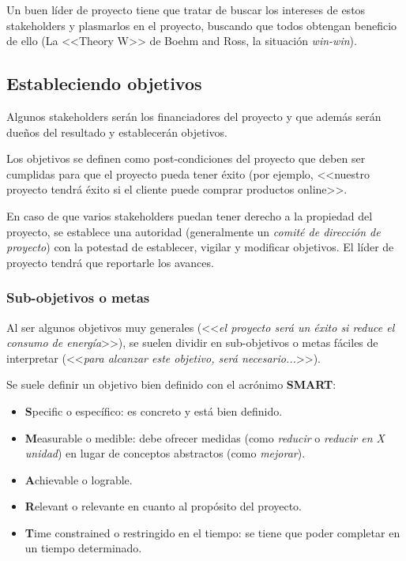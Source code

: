 \documentclass[12pt]{article}
\begin{document}
{Un buen líder de proyecto tiene que tratar de buscar los intereses de estos stakeholders y plasmarlos en el proyecto, buscando que todos obtengan beneficio de ello (La <<Theory W>> de Boehm and Ross, la situación \textit{win-win}).}

\subsection{Estableciendo objetivos}
\label{1.10.0}

{Algunos stakeholders serán los financiadores del proyecto y que además serán dueños del resultado y establecerán objetivos.} \bigskip

{Los objetivos se definen como post-condiciones del proyecto que deben ser cumplidas para que el proyecto pueda tener éxito (por ejemplo, <<nuestro proyecto tendrá éxito si el cliente puede comprar productos online>>.} \bigskip

{En caso de que varios stakeholders puedan tener derecho a la propiedad del proyecto, se establece una autoridad (generalmente un \textit{comité de dirección de proyecto}) con la potestad de establecer, vigilar y modificar objetivos. El líder de proyecto tendrá que reportarle los avances.}

\subsubsection{Sub-objetivos o metas}
\label{1.10.1}

{Al ser algunos objetivos muy generales (<<\textit{el proyecto será un éxito si reduce el consumo de energía}>>), se suelen dividir en sub-objetivos o metas fáciles de interpretar (<<\textit{para alcanzar este objetivo, será necesario...}>>).} \bigskip

{Se suele definir un objetivo bien definido con el acrónimo \textbf{SMART}:}
\begin{itemize}
    \item {\textbf{S}pecific o específico: es concreto y está bien definido.}
    \item {\textbf{M}easurable o medible: debe ofrecer medidas (como \textit{reducir} o \textit{reducir en X unidad}) en lugar de conceptos abstractos (como \textit{mejorar}).}
    \item {\textbf{A}chievable o lograble.}
    \item {\textbf{R}elevant o relevante en cuanto al propósito del proyecto.}
    \item {\textbf{T}ime constrained o restringido en el tiempo: se tiene que poder completar en un tiempo determinado.}
\end{itemize}
\end{document}
